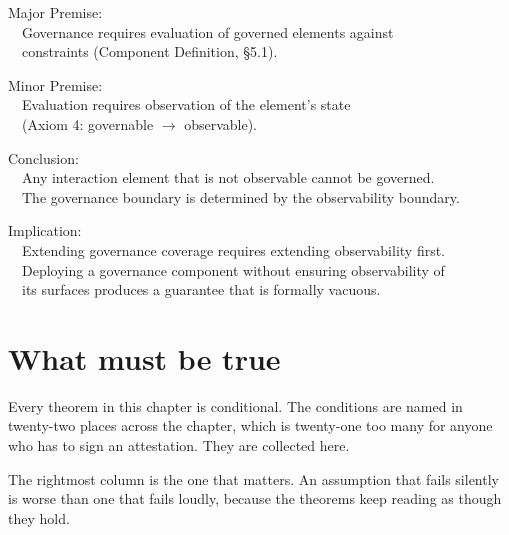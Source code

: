 \begin{claddisp}
Major Premise:\\
~~Governance requires evaluation of governed elements against\\
~~constraints (Component Definition, \S{}5.1).
\par\smallskip
Minor Premise:\\
~~Evaluation requires observation of the element's state\\
~~(Axiom 4: governable $\to$ observable).
\par\smallskip
Conclusion:\\
~~Any interaction element that is not observable cannot be governed.\\
~~The governance boundary is determined by the observability boundary.
\par\smallskip
Implication:\\
~~Extending governance coverage requires extending observability first.\\
~~Deploying a governance component without ensuring observability of\\
~~its surfaces produces a guarantee that is formally vacuous.
\end{claddisp}






\section{What must be true}


Every theorem in this chapter is conditional. The conditions are named in
twenty-two places across the chapter, which is twenty-one too many for anyone who
has to sign an attestation. They are collected here.

The rightmost column is the one that matters. An assumption that fails silently
is worse than one that fails loudly, because the theorems keep reading as though
they hold.

